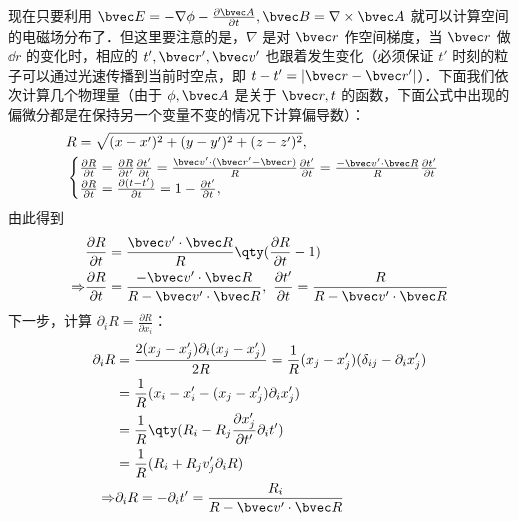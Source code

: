 现在只要利用 $\bvec E=-\nabla \phi-\frac{\partial \bvec A}{\partial t},\bvec B=\nabla\times \bvec A$ 就可以计算空间的电磁场分布了．但这里要注意的是，$\nabla$ 是对 $\bvec r$ 作空间梯度，当 $\bvec r$ 做 $\dd r$ 的变化时，相应的 $t',\bvec r',\bvec v'$ 也跟着发生变化（必须保证 $t'$ 时刻的粒子可以通过光速传播到当前时空点，即 $t-t'=|\bvec r-\bvec r'|$）．下面我们依次计算几个物理量（由于 $\phi,\bvec A$ 是关于 $\bvec r,t$ 的函数，下面公式中出现的偏微分都是在保持另一个变量不变的情况下计算偏导数）：
\begin{equation}
\begin{aligned}
&R=\sqrt{(x-x')^2+(y-y')^2+(z-z')^2},\\
&\begin{cases}
\frac{\partial R}{\partial t}=\frac{\partial R}{\partial t'}\frac{\partial t'}{\partial t}=\frac{\bvec v'\cdot (\bvec r'-\bvec r)}{R}\frac{\partial t'}{\partial t}=\frac{-\bvec v'\cdot \bvec R}{R}\frac{\partial t'}{\partial t}\\
\frac{\partial R}{\partial t}=\frac{\partial (t-t')}{\partial t}=1-\frac{\partial t'}{\partial t},\\
\end{cases}
\end{aligned}
\end{equation}
由此得到
\begin{equation}
\begin{aligned}
&\frac{\partial R}{\partial t}=\frac{\bvec v'\cdot \bvec R}{R}\qty(\frac{\partial R}{\partial t}-1)\\
\Rightarrow 
&\frac{\partial R}{\partial t}=\frac{-\bvec v'\cdot \bvec R}{R-\bvec v'\cdot \bvec R},\  
\frac{\partial t'}{\partial t}=\frac{R}{R-\bvec v'\cdot \bvec R}
\end{aligned}
\end{equation}
下一步，计算 $\partial _i R=\frac{\partial R}{\partial x_i}$：
\begin{equation}
\begin{aligned}
\partial_i R&=\frac{2(x_j-x_j')\partial_i(x_j-x'_j)}{2R}=\frac{1}{R} (x_j-x_j')(\delta_{ij} - \partial_i x_j')\\
&=\frac{1}{R}(x_i-x_i'-(x_j-x_j')\partial_i x_j')\\
&=\frac{1}{R}\qty(R_i-R_j\frac{\partial x_j'}{\partial t'}\partial_{i} t')\\
&=\frac{1}{R}(R_i+R_jv_j'\partial_i R)\\
\Rightarrow & \partial_i R=-\partial_i t'=\frac{R_i}{R-\bvec v'\cdot \bvec R}
\end{aligned}
\end{equation}
